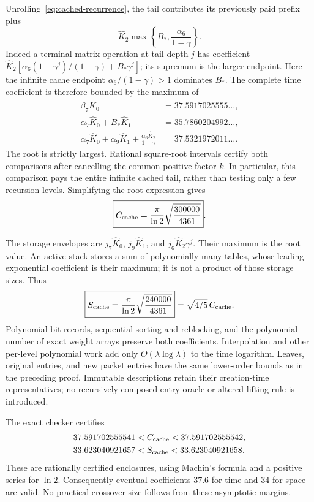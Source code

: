 Unrolling~\eqref{eq:cached-recurrence}, the tail contributes its previously
paid prefix plus
\[
 \widehat K_2\max\left\{B_*,\frac{\alpha_6}{1-\gamma}\right\}.
\]
Indeed a terminal matrix operation at tail depth $j$ has coefficient
$\widehat K_2[\alpha_6(1-\gamma^j)/(1-\gamma)+B_*\gamma^j]$;
its supremum is the larger endpoint. Here the infinite cache endpoint
$\alpha_6/(1-\gamma)>1$ dominates $B_*$. The complete time coefficient
is therefore bounded by the maximum of
\begin{align*}
 \beta_7\widehat K_0
   &=37.5917025555\ldots,\\
 \alpha_7\widehat K_0+B_*\widehat K_1
   &=35.7860204992\ldots,\\
 \alpha_7\widehat K_0+\alpha_9\widehat K_1+
          \frac{\alpha_6\widehat K_2}{1-\gamma}
   &=37.5321972011\ldots.
\end{align*}
The root is strictly largest. Rational square-root intervals certify both
comparisons after cancelling the common positive factor $k$. In particular,
this comparison pays the entire infinite cached tail, rather than testing
only a few recursion levels. Simplifying the root expression gives
\[
 \boxed{C_{\mathrm{cache}}=\frac{\pi}{\ln2}\sqrt{\frac{300000}{4361}}}.
\]

The storage envelopes are $j_7\widehat K_0$, $j_9\widehat K_1$, and
$j_6\widehat K_2\gamma^j$. Their maximum is the root value. An active
stack stores a sum of polynomially many tables, whose leading exponential
coefficient is their maximum; it is not a product of those storage sizes.
Thus
\[
 \boxed{S_{\mathrm{cache}}=\frac{\pi}{\ln2}\sqrt{\frac{240000}{4361}}}
       =\sqrt{4/5}\,C_{\mathrm{cache}}.
\]
Polynomial-bit records, sequential sorting and reblocking, and the polynomial
number of exact weight arrays preserve both coefficients. Interpolation and
other per-level polynomial work add only $O(\lambda\log\lambda)$ to the
time logarithm. Leaves, original entries, and new packet entries have the
same lower-order bounds as in the preceding proof. Immutable descriptions
retain their creation-time representatives; no recursively composed entry
oracle or altered lifting rule is introduced.

The exact checker certifies
\[
\begin{split}
 37.591702555541&<C_{\mathrm{cache}}<37.591702555542,\\
 33.623040921657&<S_{\mathrm{cache}}<33.623040921658.
\end{split}
\]
These are rationally certified enclosures, using Machin's formula and a
positive series for $\ln2$. Consequently eventual coefficients $37.6$ for
time and $34$ for space are valid. No practical crossover size follows from
these asymptotic margins.
